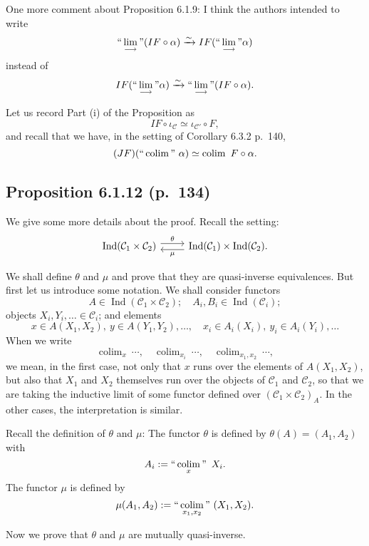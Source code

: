 \documentclass[12pt]{article}
\theoremstyle{remark}
\theoremstyle{definition}
\newcommand{\C}{\mathcal C}
\newcommand{\colim}{\operatornamewithlimits{\underset{\longrightarrow}{lim}}}
\DeclareMathOperator*{\coli}{colim}
\DeclareMathOperator*{\co}{colim}
\DeclareMathOperator*{\ic}{``\coli"}
\DeclareMathOperator{\Ind}{Ind}
\begin{document}
One more comment about Proposition 6.1.9: I think the authors intended to write 
%
\begin{equation}\label{133ii}
``\colim"(IF\circ\alpha)\xrightarrow\sim IF(``\colim"\alpha)
\end{equation} 
%
instead of 
$$
IF(``\colim"\alpha)\xrightarrow\sim``\colim"(IF\circ\alpha). 
$$ 

Let us record Part (i) of the Proposition as 
%
\begin{equation}\label{133i}
IF\circ\iota_\C\simeq\iota_{\C'}\circ F, 
\end{equation} 
%
and recall that we have, in the setting of Corollary 6.3.2 p.~140, 
%
\begin{equation}\label{140}
(JF)(``\coli"\ \alpha)\simeq\coli\ F\circ\alpha.
\end{equation}
%
%
\subsection{Proposition 6.1.12 (p.~134)}
%
We give some more details about the proof. Recall the setting: 
$$
\begin{tikzcd}
\Ind(\C_1\times\C_2)\ar[yshift=0.7ex]{r}{\theta}&\Ind(\C_1)\times\Ind(\C_2).\ar[yshift=-0.7ex]{l}{\mu}
\end{tikzcd}
$$ 

We shall define $\theta$ and $\mu$ and prove that they are quasi-inverse equivalences. But first let us introduce some notation. We shall consider functors 
$$
A\in\Ind(\C_1\times\C_2);\quad A_i,B_i\in\Ind(\C_i);
$$ 
objects $X_i,Y_i,\dots\in\C_i$; and elements 
$$
x\in A(X_1,X_2),\ y\in A(Y_1,Y_2),\dots,\quad x_i\in A_i(X_i),\ y_i\in A_i(Y_i),\dots
$$ 
When we write 
$$
\co_x\ \cdots,\quad \co_{x_i}\ \cdots,\quad \co_{x_1,x_2}\ \cdots,
$$ 
we mean, in the first case, not only that $x$ runs over the elements of $A(X_1,X_2)$, but also that $X_1$ and $X_2$ themselves run over the objects of $\C_1$ and $\C_2$, so that we are taking the inductive limit of some functor defined over $(\C_1\times\C_2)_A$. In the other cases, the interpretation is similar. 

Recall the definition of $\theta$ and $\mu$: The functor $\theta$ is defined by $\theta(A)=(A_1,A_2)$ with
%
\begin{equation}\label{ai}
A_i:=\ic_x\ X_i. 
\end{equation}
%
The functor $\mu$ is defined by 
$$
\mu(A_1,A_2):=\ic_{x_1,x_2}\ (X_1,X_2). 
$$ 

Now we prove that $\theta$ and $\mu$ are mutually quasi-inverse. 
\end{document}
